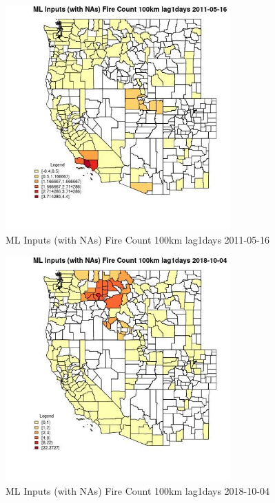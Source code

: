 \begin{figure} 
\centering  
\includegraphics[width=0.77\textwidth]{Code_Outputs/Report_ML_input_PM25_Step4_part_f_de_duplicated_aveswNAs_CountyFire_Count_100km_lag1daysMean2011-05-16.jpg} 
\caption{\label{fig:Report_ML_input_PM25_Step4_part_f_de_duplicated_aveswNAsCountyFire_Count_100km_lag1daysMean2011-05-16}ML Inputs (with NAs) Fire Count 100km lag1days 2011-05-16} 
\end{figure} 
 

\clearpage 

\begin{figure} 
\centering  
\includegraphics[width=0.77\textwidth]{Code_Outputs/Report_ML_input_PM25_Step4_part_f_de_duplicated_aveswNAs_CountyFire_Count_100km_lag1daysMean2018-10-04.jpg} 
\caption{\label{fig:Report_ML_input_PM25_Step4_part_f_de_duplicated_aveswNAsCountyFire_Count_100km_lag1daysMean2018-10-04}ML Inputs (with NAs) Fire Count 100km lag1days 2018-10-04} 
\end{figure} 
 

